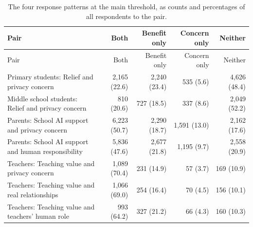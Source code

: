 \begin{longtable}{@{}p{}rrrr@{}}
\caption{The four response patterns at the main threshold, as counts and percentages of all respondents to the pair.}\label{tab:joint_quadrants}\\
\toprule Pair & Both & Benefit only & Concern only & Neither \\ \midrule \endfirsthead
\toprule Pair & Both & Benefit only & Concern only & Neither \\ \midrule \endhead
\bottomrule \endfoot
Primary students: Relief and privacy concern & 2{,}165 (22.6) & 2{,}240 (23.4) & 535 (5.6) & 4{,}626 (48.4) \\
Middle school students: Relief and privacy concern & 810 (20.6) & 727 (18.5) & 337 (8.6) & 2{,}049 (52.2) \\
Parents: School AI support and privacy concern & 6{,}223 (50.7) & 2{,}290 (18.7) & 1{,}591 (13.0) & 2{,}162 (17.6) \\
Parents: School AI support and human responsibility & 5{,}836 (47.6) & 2{,}677 (21.8) & 1{,}195 (9.7) & 2{,}558 (20.9) \\
Teachers: Teaching value and privacy concern & 1{,}089 (70.4) & 231 (14.9) & 57 (3.7) & 169 (10.9) \\
Teachers: Teaching value and real relationships & 1{,}066 (69.0) & 254 (16.4) & 70 (4.5) & 156 (10.1) \\
Teachers: Teaching value and teachers' human role & 993 (64.2) & 327 (21.2) & 66 (4.3) & 160 (10.3) \\
\end{longtable}


